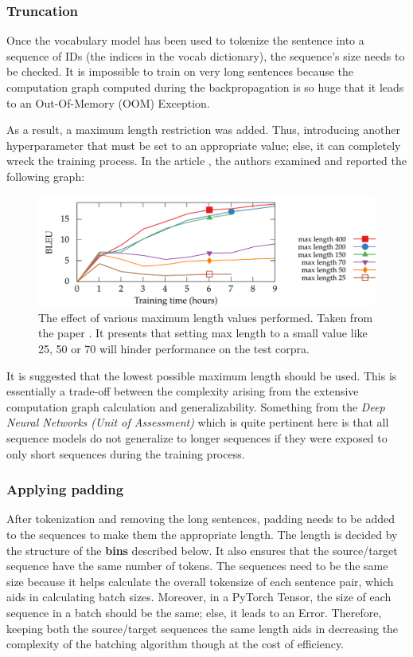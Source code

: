 \documentclass[12pt,a4paper,twoside,openright]{report}
\begin{document}
\subsubsection{Truncation}
Once the vocabulary model has been used to tokenize the sentence into a sequence of IDs (the indices in the vocab dictionary), the sequence's size needs to be checked. It is impossible to train on very long sentences because the computation graph computed during the backpropagation is so huge that it leads to an Out-Of-Memory (OOM) Exception. 

As a result, a maximum length restriction was added. Thus, introducing another hyperparameter that must be set to an appropriate value; else, it can completely wreck the training process. In the article \cite{training-tips}, the authors examined and reported the following graph: 

\begin{figure}
    \centering
    \includegraphics[width=\textwidth]{figs/fig4frompaper-trainingtips.PNG}
    \caption{The effect of various maximum length values performed. Taken from the paper \cite{training-tips}. It presents that setting max length to a small value like 25, 50 or 70 will hinder performance on the test corpra.}
    \label{fig:figure-4-from-paper}
\end{figure}

It is suggested that the lowest possible maximum length should be used. This is essentially a trade-off between the complexity arising from the extensive computation graph calculation and generalizability.
Something from the \textit{Deep Neural Networks (Unit of Assessment)} which is quite pertinent here is that all sequence models do not generalize to longer sequences if they were exposed to only short sequences during the training process.

\subsubsection{Applying padding}
After tokenization and removing the long sentences, padding needs to be added to the sequences to make them the appropriate length. The length is decided by the structure of the \textbf{bins} described below. It also ensures that the source/target sequence have the same number of tokens. The sequences need to be the same size because it helps calculate the overall tokensize of each sentence pair, which aids in calculating batch sizes. Moreover,  in a PyTorch Tensor, the size of each sequence in a batch should be the same; else, it leads to an Error. Therefore, keeping both the source/target sequences the same length aids in decreasing the complexity of the batching algorithm though at the cost of efficiency. 
\end{document}

